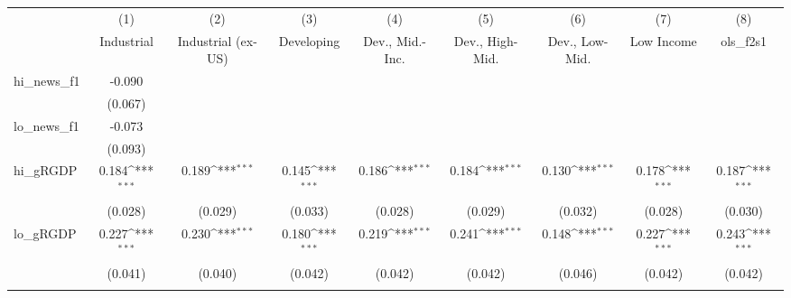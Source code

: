{
\def\sym#1{\ifmmode^{#1}\else\(^{#1}\)\fi}
\begin{tabular}{l*{8}{c}}
\toprule
            &\multicolumn{1}{c}{(1)}&\multicolumn{1}{c}{(2)}&\multicolumn{1}{c}{(3)}&\multicolumn{1}{c}{(4)}&\multicolumn{1}{c}{(5)}&\multicolumn{1}{c}{(6)}&\multicolumn{1}{c}{(7)}&\multicolumn{1}{c}{(8)}\\
            &\multicolumn{1}{c}{Industrial}&\multicolumn{1}{c}{Industrial (ex-US)}&\multicolumn{1}{c}{Developing}&\multicolumn{1}{c}{Dev., Mid.-Inc.}&\multicolumn{1}{c}{Dev., High-Mid.}&\multicolumn{1}{c}{Dev., Low-Mid.}&\multicolumn{1}{c}{Low Income}&\multicolumn{1}{c}{ols\_f2s1}\\
\midrule
hi\_news\_f1  &      -0.090         &                     &                     &                     &                     &                     &                     &                     \\
            &     (0.067)         &                     &                     &                     &                     &                     &                     &                     \\
\addlinespace
lo\_news\_f1  &      -0.073         &                     &                     &                     &                     &                     &                     &                     \\
            &     (0.093)         &                     &                     &                     &                     &                     &                     &                     \\
\addlinespace
hi\_gRGDP    &       0.184\sym{***}&       0.189\sym{***}&       0.145\sym{***}&       0.186\sym{***}&       0.184\sym{***}&       0.130\sym{***}&       0.178\sym{***}&       0.187\sym{***}\\
            &     (0.028)         &     (0.029)         &     (0.033)         &     (0.028)         &     (0.029)         &     (0.032)         &     (0.028)         &     (0.030)         \\
\addlinespace
lo\_gRGDP    &       0.227\sym{***}&       0.230\sym{***}&       0.180\sym{***}&       0.219\sym{***}&       0.241\sym{***}&       0.148\sym{***}&       0.227\sym{***}&       0.243\sym{***}\\
            &     (0.041)         &     (0.040)         &     (0.042)         &     (0.042)         &     (0.042)         &     (0.046)         &     (0.042)         &     (0.042)         \\
\addlinespace

\end{tabular}}
